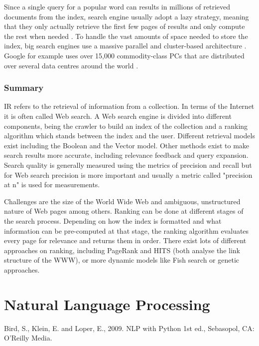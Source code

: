Since a single query for a popular word can results in  millions of retrieved documents from the index, search engine usually adopt a lazy strategy, meaning that they only actually retrieve the first few pages of results and only compute the rest when needed \citep[p.459]{Baeza-Yates2011}. To handle the vast amounts of space needed to store the index, big search engines use a massive parallel and cluster-based architecture \citep[p.459]{Baeza-Yates2011}. Google for example uses over 15,000 commodity-class PCs that are distributed over several data centres around the world \citep{Dean2003}.

\subsubsection{Summary}
IR refers to the retrieval of information from a collection. In terms of the Internet it is often called Web search. A Web search engine is divided into different components, being the crawler to build an index of the collection and a ranking algorithm which stands between the index and the user.
Different retrieval models exist including the Boolean and the Vector model. Other methods exist to make search results more accurate, including relevance feedback and query expansion.
Search quality is generally measured using the metrics of precision and recall but for Web search precision is more important and usually a metric called "precision at n" is used for measurements.

Challenges are the size of the World Wide Web and ambiguous, unstructured nature of Web pages among others.
Ranking can be done at different stages of the search process. Depending on how the index is formatted and what information can be pre-computed at that stage, the ranking algorithm evaluates every page for relevance and returns them in order. There exist lots of different approaches on ranking, including PageRank and HITS (both analyse the link structure of the WWW), or more dynamic models like Fish search or genetic approaches.


\section{Natural Language Processing}

\begin{comment}
Damerau-Levensthein for clinamen!
\end{comment}

Bird, S., Klein, E. and Loper, E., 2009. NLP with Python 1st ed., Sebasopol, CA: O'Reilly Media.\citep{Bird2009}

